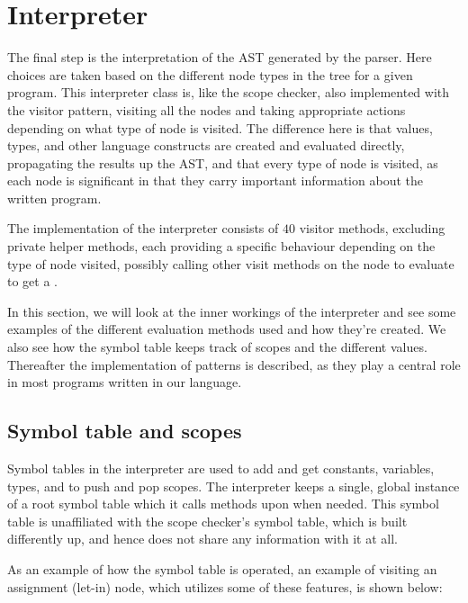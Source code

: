 \section{Interpreter}
The final step is the interpretation of the AST generated by the parser.
Here choices are taken based on the different node types in the tree
for a given program. This interpreter class is, like the scope checker,
also implemented with the visitor pattern, visiting all the nodes and
taking appropriate actions depending on what type of node is visited.
The difference here is that values, types, and other language constructs
are created and evaluated directly, propagating the results up the AST,
and that every type of node is visited, as each node is significant in
that they carry important information about the written program.

The implementation of the interpreter consists of $40$ visitor methods,
excluding private helper methods, each providing a specific behaviour
depending on the type of node visited, possibly calling other visit
methods on the node to evaluate to get a .

In this section, we will look at the inner workings of the interpreter
and see some examples of the different evaluation methods used and how
they're created. We also see how the symbol table keeps track of scopes
and the different values. Thereafter the implementation of patterns is
described, as they play a central role in most programs written in our
language.


\subsection{Symbol table and scopes}
Symbol tables in the interpreter are used to add and get constants,
variables, types, and to push and pop scopes. The interpreter keeps a
single, global instance of a root symbol table which it calls methods
upon when needed. This symbol table is unaffiliated with the scope
checker's symbol table, which is built differently up, and hence does
not share any information with it at all.

As an example of how the symbol table is operated, an example of
visiting an assignment (let-in) node, which utilizes some of these
features, is shown below:

